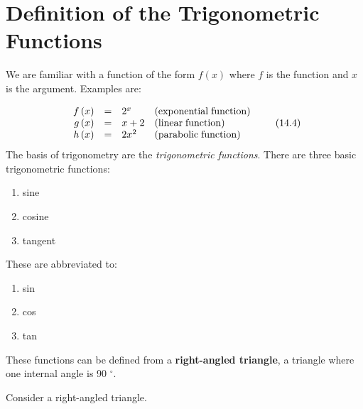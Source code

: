             \section{ Definition of the Trigonometric Functions}
            \nopagebreak
      \label{m39408*id79356}We are familiar with a function of the form $f\left(x\right)$ where $f$ is the function and $x$ is the argument. Examples are:\par 
      \label{m39408*id79391}\nopagebreak\noindent{}
    \begin{equation}
    \begin{array}{cccc}\hfill f\left(x\right)& =& {2}^{x}\hfill & \mathrm{\left(exponential\; function\right)}\hfill \\ \hfill g\left(x\right)& =& x+2\hfill & \mathrm{\left(linear\; function\right)}\hfill \\ \hfill h\left(x\right)& =& 2{x}^{2}\hfill & \mathrm{\left(parabolic\; function\right)}\hfill \end{array}\tag{14.4}
      \end{equation}
      \label{m39408*id79540}The basis of trigonometry are the \textsl{trigonometric functions}. There are three basic trigonometric functions:\par 
      \label{m39408*id79552}\begin{enumerate}[noitemsep, label=\textbf{\arabic*}. ] 
            \label{m39408*uid15}\item sine
\label{m39408*uid16}\item cosine
\label{m39408*uid17}\item tangent
\end{enumerate}
      \label{m39408*id79593}These are abbreviated to:\par 
      \label{m39408*id79596}\begin{enumerate}[noitemsep, label=\textbf{\arabic*}. ] 
            \label{m39408*uid18}\item sin
\label{m39408*uid19}\item cos
\label{m39408*uid20}\item tan
\end{enumerate}
      \label{m39408*id79636}These functions can be defined from a \textbf{right-angled triangle}, a triangle where one internal angle is 90 ${}^{\circ }$.\par 
      \label{m39408*id79660}Consider a right-angled triangle.\par 
      \label{m39408*id79664}
    \setcounter{subfigure}{0}
